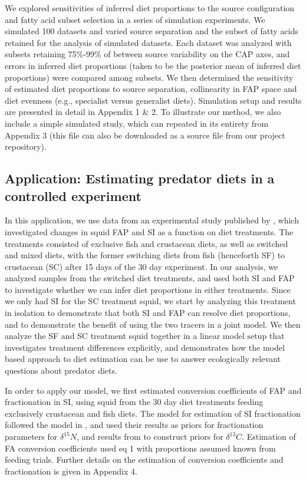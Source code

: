 \documentclass[12pt]{article}%
\begin{document}
\begin{spacing}{1.9}
\begin{flushleft}
We explored sensitivities of inferred diet proportions to the source
configuration and fatty acid subset selection in a series of
simulation experiments. We simulated 100 datasets and varied source
separation and the subset of fatty acids retained for the analysis of
simulated datasets. Each dataset was analyzed with subsets retaining
75\%-99\% of between source variability on the CAP axes, and errors in
inferred diet proportions (taken to be the posterior mean of inferred
diet proportions) were compared among subsets. We then determined the 
sensitivity of estimated diet proportions to source separation,
collinearity in FAP space and diet evenness (e.g., specialist versus 
generalist diets). Simulation setup and results are presented in
detail in Appendix 1 \& 2. To illustrate our method, we also include 
a simple simulated study, which can repeated in its entirety from 
Appendix 3 (this file can also be downloaded as a source file from our project repository).


\subsection{Application: Estimating predator diets in a controlled
  experiment}

In this application, we use data from an experimental study published
by \citet{stowasser_experimental_2006}, which investigated changes in squid FAP
and SI as a function on diet treatments. The treatments consisted of
exclusive fish and crustacean diets, as well as switched and mixed
diets, with the former switching diets from fish (henceforth SF) to
crustacean (SC) after 15 days of the 30 day experiment. In our
analysis, we analyzed samples from the switched diet treatments, and
used both SI and FAP to investigate whether we can infer diet
proportions in either treatments. Since we only had SI for the SC
treatment squid, we start by analyzing this treatment in isolation to
demonstrate that both SI and FAP can resolve diet proportions, and to
demonstrate the benefit of using the two tracers in a joint model. We
then analyze the SF and SC treatment squid together in a linear model
setup that investigates treatment differences explicitly, and
demonstrates how the model based approach to diet estimation can be
use to answer ecologically relevant questions about predator diets.

In order to apply our model, we first estimated conversion
coefficients of FAP and fractionation in SI, using squid from the 30
day diet treatments feeding exclusively crustacean and fish diets. The
model for estimation of SI fractionation followed the model in \citet{hussey_rescaling_2014}, and used their results as priors for fractionation
parameters for $\delta^{15}N$, and results from \citet{caut_variation_2009} to
construct priors for $\delta^{13}C$. Estimation of FA conversion coefficients used
eq 1 with proportions assumed known from feeding trials. Further
details on the estimation of conversion coefficients and fractionation
is given in Appendix 4.


\end{flushleft}
\end{spacing}
\end{document}
